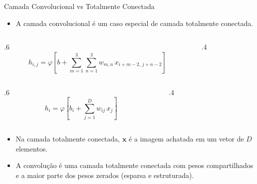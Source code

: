 \documentclass[aspectratio=169,xcolor=dvipsnames]{beamer}
\begin{document}
\begin{frame}{Camada Convolucional vs Totalmente Conectada}
\begin{itemize}
    \item A camada convolucional é um caso especial de camada totalmente conectada.
\end{itemize}
\vspace{0.4em}
\begin{columns}
    \begin{column}{.6\linewidth}
        \centering
        \begin{equation*}
            h_{i,j} = \varphi\!\left[b + \sum_{m=1}^{3}\sum_{n=1}^{3} w_{m,n}\, x_{i+m-2,\, j+n-2}\right]
        \end{equation*}
    \end{column}
    \begin{column}{.4\linewidth}
    \end{column}
\end{columns}
\vspace{0.6em}
\begin{columns}
    \begin{column}{.6\linewidth}
        \centering
        \begin{equation*}
            h_i = \varphi\!\left[b_i + \sum_{j=1}^{D} w_{ij}\, x_{j}\right]
        \end{equation*}
    \end{column}
    \begin{column}{.4\linewidth}
    \end{column}
\end{columns}
\vspace{0.6em}
\begin{itemize}
    \item Na camada totalmente conectada, $\mathbf{x}$ é a imagem achatada em um vetor de $D$ elementos.
    \item A convolução é uma camada totalmente conectada com pesos compartilhados e a maior parte dos pesos zerados (esparsa e estruturada).
\end{itemize}
\end{frame}
\end{document}
